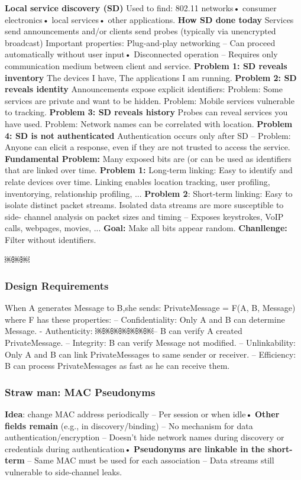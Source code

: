 \documentclass[9pt]{extarticle}
\begin{document}
\begin{multicols}{2}
\textbf{Local service discovery (SD)} Used to find: 802.11 networks• consumer electronics• local services• other applications. \textbf{How SD done today} Services send announcements and/or clients send probes (typically via unencrypted broadcast)
Important properties: Plug-and-play networking
– Can proceed automatically without user input• Disconnected operation – Requires only communication medium between client and service. \textbf{Problem 1: SD reveals inventory} The devices I have, The applications I am running. \textbf{Problem 2: SD reveals identity} Announcements expose explicit identifiers: Problem: Some services are private and want to be hidden. Problem: Mobile services vulnerable to tracking. \textbf{Problem 3: SD reveals history} Probes can reveal services you have used. Problem: Network names can be correlated with location. \textbf{Problem 4: SD is not authenticated} Authentication occurs only after SD – Problem: Anyone can elicit a response, even if they are not trusted to access the service. \textbf{Fundamental Problem:} Many exposed bits are (or can be used as identifiers that are linked over time. \textbf{Problem 1:} Long-term linking: Easy to identify and relate devices over time. Linking enables location tracking, user profiling, inventorying, relationship profiling, ... \textbf{Problem 2}: Short-term linking: Easy to isolate distinct packet streams. Isolated data streams are more susceptible to side- channel analysis on packet sizes and timing
– Exposes keystrokes, VoIP calls, webpages, movies, ... \textbf{Goal:} Make all bits appear random. \textbf{Chanllenge: } Filter without identifiers.
 
￼￼￼
\subsubsection{Design Requirements}

When A generates Message to B,she sends: PrivateMessage = F(A, B, Message) where F has these properties: – Confidentiality: Only A and B can determine Message. - Authenticity: ￼￼￼￼￼￼￼– B can verify A created PrivateMessage. – Integrity: B can verify Message not modified. – Unlinkability: Only A and B can link PrivateMessages to same sender or receiver. – Efficiency:
B can process PrivateMessages as fast as he can receive them. 


\subsubsection{Straw man: MAC Pseudonyms}
\textbf{Idea}: change MAC address periodically – Per session or when idle• \textbf{Other fields remain} (e.g., in discovery/binding) – No mechanism for data authentication/encryption – Doesn’t hide network names during discovery or credentials during authentication• \textbf{Pseudonyms are linkable in the short-term} – Same MAC must be used for each association – Data streams still vulnerable to side-channel leaks. 


\end{multicols}
\end{document}

